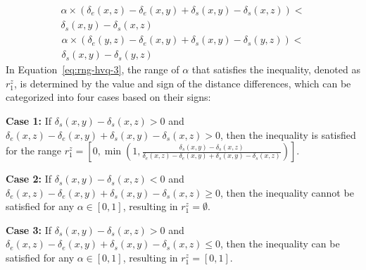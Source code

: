 
\begin{equation}
\begin{aligned}
\alpha \times (\delta_e(x, z) - \delta_e(x, y) + \delta_s(x, y) - \delta_s(x, z)) < \\
\delta_s(x, y) - \delta_s(x, z)
\end{aligned}
\label{eq:rng-hvq-3}
\end{equation}
\begin{equation}
\begin{aligned}
\alpha \times (\delta_e(y, z) - \delta_e(x, y) + \delta_s(x, y) - \delta_s(y, z)) < \\
\delta_s(x, y) - \delta_s(y, z)
\end{aligned}
\label{eq:rng-hvq-4}
\end{equation}
In Equation~\ref{eq:rng-hvq-3}, the range of $\alpha$ that satisfies the inequality, denoted as $r_1^z$, is determined by the value and sign of the distance differences, which can be categorized into four cases based on their signs:




\noindent\textbf{Case 1:} If $\delta_s(x, y)-\delta_s(x, z) > 0$ and $\delta_e(x, z)-\delta_e(x, y)+\delta_s(x, y)-\delta_s(x, z) > 0$, then the inequality is satisfied for the range $r_1^z = \left[0, \min\left(1, \frac{\delta_s(x, y) - \delta_s(x, z)}{\delta_e(x, z) - \delta_e(x, y) + \delta_s(x, y) - \delta_s(x, z)}\right)\right]$.

\noindent\textbf{Case 2:} If $\delta_s(x, y) - \delta_s(x, z) < 0$ and $\delta_e(x, z) - \delta_e(x, y) + \delta_s(x, y) - \delta_s(x, z) \geq 0$, then the inequality cannot be satisfied for any $\alpha \in [0, 1]$, resulting in $r_1^z = \emptyset$.

\noindent\textbf{Case 3:} If $\delta_s(x, y) - \delta_s(x, z) > 0$ and $\delta_e(x, z) - \delta_e(x, y) + \delta_s(x, y) - \delta_s(x, z) \leq 0$, then the inequality can be satisfied for any $\alpha \in [0, 1]$, resulting in $r_1^z = [0, 1]$. 

